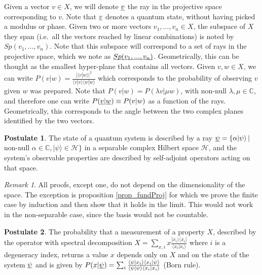 \documentclass[aps,prl,amsmath,amssymb,twocolumn,nofootinbib]{revtex4}
\theoremstyle{plain}
\theoremstyle{definition}
\newtheorem{post}{Postulate}[]
\theoremstyle{remark}
\newtheorem*{remark}{Remark}
\newcommand{\pj}[1] {\underbar{$#1$}}
\def\>{\rangle}
\def\<{\langle}
\begin{document}
	Given a vector $v \in X$, we will denote $\pj{v}$ the ray in the
	projective space corresponding to $v$. Note that $\pj{v}$ denotes a
	quantum state, without having picked a modulus or phase. Given two or
	more vectors $v_1, ..., v_n \in X$, the subspace of $X$ they span
	(i.e.~all the vectors reached by linear combinations) is noted by
	$Sp(v_1, ..., v_n)$. Note that this subspace will correspond to a set
	of rays in the projective space, which we note as $\pj{Sp(v_1, ...,
		v_n)}$. Geometrically, this can be thought as the smallest hyper-plane that contains all vectors. Given $v,w \in X$, we can write $P(v|w) = \frac{|\< v | w
		\>|^2}{\< v | v \>\< w | w \>}$ which corresponds to the probability
	of observing $v$ given $w$ was prepared. Note that $P(v|w) = P(\lambda
	v| \mu w)$, with non-null $\lambda,\mu\in{\mathbb C}$, and therefore
	one can write $P(\pj{v} | \pj{w})\equiv P(v|w)$ as a function of the
	rays. Geometrically, this corresponds to the angle between the two complex planes identified by the two vectors.
	
	
	\begin{post}\label{post_state}
		The state of a quantum system is described by a ray $\pj{\psi} = \{
		\alpha |\psi\> \, |$ non-null $\alpha \in
		\mathbb{C},|\psi\>\in\mathcal{H}\}$ in a separable complex Hilbert space
		$\mathcal{H}$, and the system's observable properties are described
		by self-adjoint operators acting on that space. %
	\end{post}
	
	\begin{remark}
		All proofs, except one, do not depend on the dimensionality of
		the space. The exception is proposition \ref{prop_fundProj} for which we prove the finite case by induction and then show that it holds in the limit. This would not work in the non-separable case, since the basis would not be countable.
	\end{remark}
	
	\begin{post}\label{post_measurements}
		The probability that a measurement of a property $X$, described by the operator with
		spectral decomposition $X = \sum_{x,i }x \frac{| x_i \> \< x_i |}{\< x_i | x_i \>}$  where $i$ is a degeneracy index, returns a value $x$ depends only on $X$ and on the state of the system $\pj{\psi}$ and is given by $P(x|\pj{\psi})=\sum_i \frac{\<\psi| x_i \> \< x_i |\psi\>}{\< \psi | \psi \>\< x_i | x_i \>}$
		(Born rule).\end{post}
	
\end{document}
